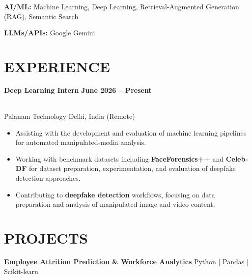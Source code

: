 \documentclass[10pt,a4paper]{article}
\begin{document}
\textbf{AI/ML:} Machine Learning, Deep Learning, Retrieval-Augmented Generation (RAG), Semantic Search

\vspace{2pt}

\textbf{LLMs/APIs:} Google Gemini

\vspace{2pt}


\section*{EXPERIENCE}

\textbf{Deep Learning Intern}
\hfill
\textbf{June 2026 -- Present}

\\[-2pt]

Palanam Technology
\hfill
Delhi, India (Remote)

\begin{itemize}[leftmargin=15pt,itemsep=1pt,topsep=1pt,parsep=0pt,partopsep=0pt]

\item Assisting with the development and evaluation of machine learning pipelines for automated manipulated-media analysis.

\item Working with benchmark datasets including \textbf{FaceForensics++} and \textbf{Celeb-DF} for dataset preparation, experimentation, and evaluation of deepfake detection approaches.

\item Contributing to \textbf{deepfake detection} workflows, focusing on data preparation and analysis of manipulated image and video content.

\end{itemize}

\vspace{2pt}

\section*{PROJECTS}

\textbf{Employee Attrition Prediction \& Workforce Analytics} \hfill Python | Pandas | Scikit-learn
\end{document}
